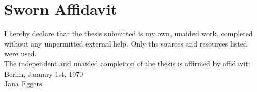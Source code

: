 
\cleardoublepage
\section*{Sworn Affidavit}

\begin{flushleft}
    I hereby declare that the thesis submitted is my own, unaided work, completed without any unpermitted external help. Only the sources and resources listed were used.\\
    \vspace{0.5cm}
    The independent and unaided completion of the thesis is affirmed by affidavit:\\
    \vspace{1.0cm}
    Berlin, January 1st, 1970
    \\
    \vspace{3.5cm}
    Jana Eggers
\end{flushleft}
